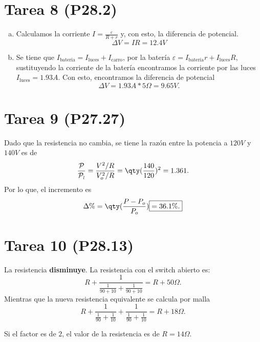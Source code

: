 \section*{Tarea 8 (P28.2)}


\begin{enumerate}[a)]
	\item Calculamos la corriente $I = \frac{\varepsilon}{R + r}$ y, con esto, la diferencia de potencial.
		$$ \boxed{ \Delta V = IR = 12.4V } $$
	\item Se tiene que $I_{\text{bateria}} = I_{\text{luces}} + I_{\text{carro}}$, por la batería $\varepsilon = I_{\text{bateria}} r + I_{\text{luces}} R$, sustituyendo la corriente de la batería encontramos la corriente por las luces $I_{\text{luces}} = 1.93A$. Con esto, encontramos la diferencia de potencial
		$$ \boxed{\Delta V = 1.93A*5\Omega = 9.65V .} $$
\end{enumerate}










\section*{Tarea 9 (P27.27)}

Dado que la resistencia no cambia, se tiene la razón entre la potencia a $120V$ y $140V$ es de
	$$ \frac{\mathcal{P}}{\mathcal{P_o}} = \frac{V^2 /R}{V_o ^2 /R} = \qty(\frac{140}{120})^2 = 1.361. $$
Por lo que, el incremento es
	$$ \Delta \% = \qty(\frac{P - P_o}{P_o}) \boxed{ = 36.1\% .} $$







\section*{Tarea 10 (P28.13)}


La resistencia \textbf{disminuye}. La resistencia con el switch abierto es:
	$$ R + \frac{1}{\frac{1}{90 + 10} + \frac{1}{90 + 10}} = R + 50\Omega . $$
	Mientras que la nueva resistencia equivalente se calcula por malla
	$$ R + \frac{1}{\frac{1}{90} + \frac{1}{10}} + \frac{1}{\frac{1}{90} + \frac{1}{10}} = R + 18\Omega . $$

Si el factor es de $2$, el valor de la resistencia es de $R = 14\Omega$.








































